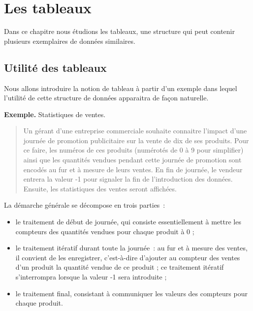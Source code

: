 \chapter{Les tableaux}

	Dans ce chapitre nous étudions les tableaux, 
	une structure qui peut contenir 
	plusieurs exemplaires de données similaires.

	\section{Utilité des tableaux}
	
		Nous allons introduire la notion de tableau à partir d’un exemple 
		dans lequel l’utilité de cette structure de données 
		apparaitra de façon naturelle.
	
		\textbf{Exemple.}
		Statistiques de ventes.
		\begin{quote}	
			Un gérant d’une entreprise commerciale 
			souhaite connaitre l’impact 
			d’une journée de promotion publicitaire 
			sur la vente de dix de ses produits.
			Pour ce faire, les numéros de ces produits 
			(numérotés de 0 à 9 pour simplifier) 
			ainsi que les quantités vendues 
			pendant cette journée de promotion 
			sont encodés au fur et à mesure de leurs ventes. 
			En fin de journée, 
			le vendeur entrera la valeur -1 
			pour signaler la fin de l’introduction des données. 
			Ensuite, les statistiques des ventes seront affichées.
		\end{quote}
	
		La démarche générale se décompose en trois parties~:
		\begin{itemize}
		\item
			le traitement de début de journée, qui consiste essentiellement à mettre
			les compteurs des quantités vendues pour chaque produit à 0 ;
		\item
			le traitement itératif durant toute la journée~: 
			au fur et à mesure des ventes, 
			il convient de les enregistrer, 
			c’est-à-dire d’ajouter au compteur des ventes d’un produit 
			la quantité vendue de ce produit ; 
			ce traitement itératif s’interrompra 
			lorsque la valeur -1 sera introduite ;
		\item
			le traitement final, consistant à communiquer les valeurs des compteurs
			pour chaque produit.
		\end{itemize}
	
